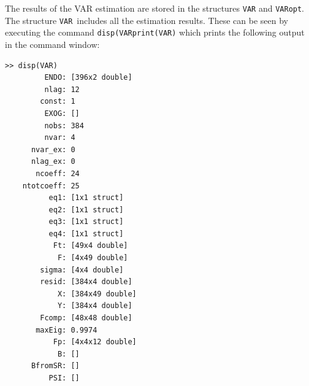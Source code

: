 \documentclass[10pt]{article}
\begin{document}

The results of the VAR estimation are stored in the structures \texttt{VAR}
and \texttt{VARopt}. The structure \texttt{VAR}\ includes all the estimation
results. These can be seen by executing the command \colorbox{script!80}{%
\texttt{disp(VARprint(VAR)}} which prints the following output in the
command window:

\setlength{\parindent}{.2cm}
\begin{verbatim}
>> disp(VAR)
         ENDO: [396x2 double]
         nlag: 12
        const: 1
         EXOG: []
         nobs: 384
         nvar: 4
      nvar_ex: 0
      nlag_ex: 0
       ncoeff: 24
    ntotcoeff: 25
          eq1: [1x1 struct]
          eq2: [1x1 struct]
          eq3: [1x1 struct]
          eq4: [1x1 struct]
           Ft: [49x4 double]
            F: [4x49 double]
        sigma: [4x4 double]
        resid: [384x4 double]
            X: [384x49 double]
            Y: [384x4 double]
        Fcomp: [48x48 double]
       maxEig: 0.9974
           Fp: [4x4x12 double]
            B: []
      BfromSR: []
          PSI: []
\end{verbatim}
\end{document}
